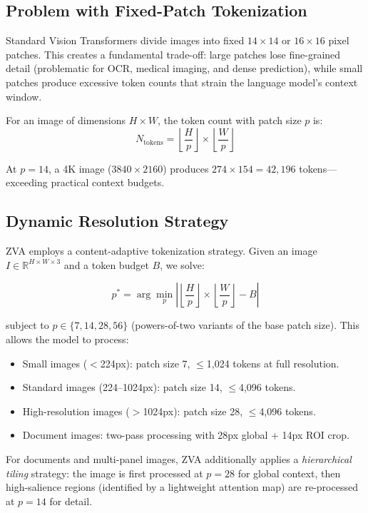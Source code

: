 \documentclass[11pt,a4paper]{article}
\begin{document}
\subsection{Problem with Fixed-Patch Tokenization}

Standard Vision Transformers divide images into fixed $14 \times 14$ or $16 \times 16$ pixel patches. This creates a fundamental trade-off: large patches lose fine-grained detail (problematic for OCR, medical imaging, and dense prediction), while small patches produce excessive token counts that strain the language model's context window.

For an image of dimensions $H \times W$, the token count with patch size $p$ is:
\begin{equation}
N_{\text{tokens}} = \left\lfloor\frac{H}{p}\right\rfloor \times \left\lfloor\frac{W}{p}\right\rfloor
\end{equation}

At $p=14$, a 4K image ($3840 \times 2160$) produces $274 \times 154 = 42,196$ tokens—exceeding practical context budgets.

\subsection{Dynamic Resolution Strategy}

ZVA employs a content-adaptive tokenization strategy. Given an image $I \in \mathbb{R}^{H \times W \times 3}$ and a token budget $B$, we solve:

\begin{equation}
p^* = \arg\min_p \left| \left\lfloor\frac{H}{p}\right\rfloor \times \left\lfloor\frac{W}{p}\right\rfloor - B \right|
\end{equation}

subject to $p \in \{7, 14, 28, 56\}$ (powers-of-two variants of the base patch size). This allows the model to process:
\begin{itemize}
  \item Small images ($<$224px): patch size 7, $\leq$1,024 tokens at full resolution.
  \item Standard images (224--1024px): patch size 14, $\leq$4,096 tokens.
  \item High-resolution images ($>$1024px): patch size 28, $\leq$4,096 tokens.
  \item Document images: two-pass processing with 28px global + 14px ROI crop.
\end{itemize}

For documents and multi-panel images, ZVA additionally applies a \emph{hierarchical tiling} strategy: the image is first processed at $p=28$ for global context, then high-salience regions (identified by a lightweight attention map) are re-processed at $p=14$ for detail.
\end{document}
